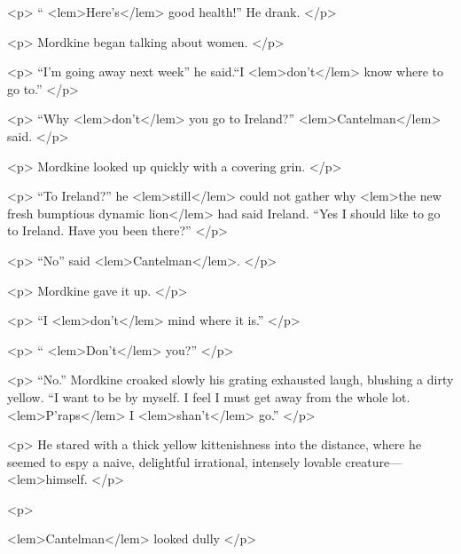 {{				<p>
				“
<lem>Here's</lem>{} good health!” He drank. 
				</p> 
				
				<p>
Mordkine began talking about women. 
 				</p> 

				<p>
				“I'm going away next week” he said.“I 
<lem>don't</lem>{} know where to go to.” 
 				</p> 

				<p>
				“Why 
<lem>don't</lem>{} you go to Ireland?” 
<lem>Cantelman</lem>{} said. 
 				</p> 

				<p>
				Mordkine looked up quickly with a covering grin. 
 				</p> 

				<p>
				“To Ireland?” he 
<lem>still</lem>{} could not gather why 
<lem>the new fresh bumptious dynamic lion</lem>
					{} 
				had said Ireland. 
				“Yes I should like to go to Ireland. Have you been there?” 
 				</p> 

				<p>
				“No” said 
<lem>Cantelman</lem>{}. 
 				</p> 

				<p>
				Mordkine gave it up. 
 				</p> 

				<p>
				“I 
<lem>don't</lem>{} mind where it is.” 
 				</p> 

				<p>
				“
<lem>Don't</lem>{} you?” 
 				</p> 

				<p>
				“No.” Mordkine croaked slowly his grating exhausted laugh, blushing a dirty yellow. 
				“I want to be by myself. I feel I must get away from the whole lot. 
<lem>P'raps</lem>
					{} 
				I 
<lem>shan't</lem>{} go.”
 				</p> 

				<p>
				He stared with a thick yellow kittenishness into the distance, where he seemed to espy 
				a naive, delightful irrational, intensely lovable creature---
<lem>himself. 
					{} 
				</p> 

				<p>
				
<lem>Cantelman</lem>{} looked dully 
					{} 
				</p> 

}}
